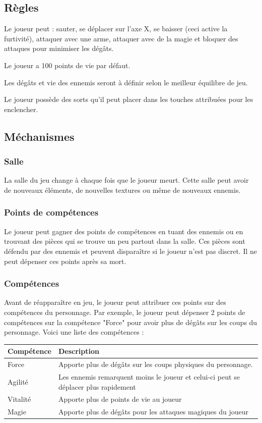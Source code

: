\documentclass[11pt, a4paper, oneside]{report}
\begin{document}
\subsection{Règles}
\begin{description}
	\item Le joueur peut : sauter, se déplacer sur l'axe X, se baisser (ceci active la furtivité), attaquer avec une arme, attaquer avec de la magie et bloquer des attaques pour minimiser les dégâts.
	\item Le joueur a 100 points de vie par défaut.
	\item Les dégâts et vie des ennemis seront à définir selon le meilleur équilibre de jeu.
	\item Le joueur possède des sorts qu'il peut placer dans les touches attribuées pour les enclencher.
\end{description}

\subsection{Méchanismes}
\subsubsection{Salle}
La salle du jeu change à chaque fois que le joueur meurt. Cette salle peut avoir de nouveaux éléments, de nouvelles textures ou même de nouveaux ennemis.

\subsubsection{Points de compétences}
Le joueur peut gagner des points de compétences en tuant des ennemis ou en trouvant des pièces qui se trouve un peu partout dans la salle. Ces pièces sont défendu par des ennemis et peuvent disparaître si le joueur n'est pas discret. Il ne peut dépenser ces points après sa mort. 

\subsubsection{Compétences}
Avant de réapparaître en jeu, le joueur peut attribuer ces points sur des compétences du personnage. Par exemple, le joueur peut dépenser 2 points de compétences sur la compétence "Force" pour avoir plus de dégâts sur les coups du personnage. Voici une liste des compétences :

\begin{center}
\begin{tabularx}{\textwidth}{l X}
	\hline
	\textbf{Compétence} & \textbf{Description}\\
	\hline \hline
	Force & Apporte plus de dégâts sur les coups physiques du personnage.\\
	Agilité & Les ennemis remarquent moins le joueur et celui-ci peut se déplacer plus rapidement\\
	Vitalité & Apporte plus de points de vie au joueur\\
	Magie & Apporte plus de dégâts pour les attaques magiques du joueur\\
	\hline
\end{tabularx}
\end{center}
\end{document}

